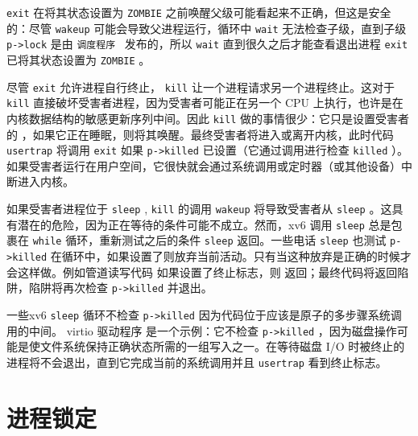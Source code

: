 \documentclass[UTF8]{article}
\begin{document}
{   \lstinline{exit}    在将其状态设置为    \lstinline{ZOMBIE}    之前唤醒父级可能看起来不正确，但这是安全的：尽管
    \lstinline{wakeup}    可能会导致父进程运行，循环中
    \lstinline{wait}    无法检查子级，直到子级
    \lstinline{p->lock}    是由  {    \tt    调度程序   }  发布的，所以
    \lstinline{wait}    直到很久之后才能查看退出进程
    \lstinline{exit}    已将其状态设置为
    \lstinline{ZOMBIE}   
        。  

尽管
    \lstinline{exit}    允许进程自行终止，
    \lstinline{kill}   
        让一个进程请求另一个进程终止。这对于
    \lstinline{kill}    直接破坏受害者进程，因为受害者可能正在另一个 CPU 上执行，也许是在内核数据结构的敏感更新序列中间。因此
    \lstinline{kill}    做的事情很少：它只是设置受害者的
       ，如果它正在睡眠，则将其唤醒。最终受害者将进入或离开内核，此时代码
    \lstinline{usertrap}    将调用
    \lstinline{exit}    如果
    \lstinline{p->killed}    已设置（它通过调用进行检查
    \lstinline{killed}   
        ）。如果受害者运行在用户空间，它很快就会通过系统调用或定时器（或其他设备）中断进入内核。  

如果受害者进程位于
    \lstinline{sleep}    ,
    \lstinline{kill}    的调用
    \lstinline{wakeup}    将导致受害者从
    \lstinline{sleep}    。这具有潜在的危险，因为正在等待的条件可能不成立。然而，xv6 调用
    \lstinline{sleep}    总是包裹在
    \lstinline{while}    循环，重新测试之后的条件
    \lstinline{sleep}    返回。一些电话
    \lstinline{sleep}    也测试
    \lstinline{p->killed}    在循环中，如果设置了则放弃当前活动。只有当这种放弃是正确的时候才会这样做。例如管道读写代码
 如果设置了终止标志，则        返回；最终代码将返回陷阱，陷阱将再次检查    \lstinline{p->killed}    并退出。  

一些xv6
    \lstinline{sleep}    循环不检查
    \lstinline{p->killed}    因为代码位于应该是原子的多步骤系统调用的中间。 virtio 驱动程序
        是一个示例：它不检查
    \lstinline{p->killed}   ，因为磁盘操作可能是使文件系统保持正确状态所需的一组写入之一。在等待磁盘 I/O 时被终止的进程将不会退出，直到它完成当前的系统调用并且
    \lstinline{usertrap}    看到终止标志。  

   \section{进程锁定  }     

}
\end{document}

